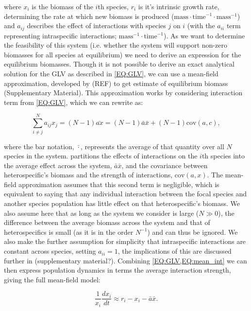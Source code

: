 \documentclass{article}
\begin{document}
where $x_i$ is the biomass of the $i$th species, $r_i$ is it's intrinsic growth rate, determining the rate at which new biomass is produced ($\text{mass} \cdot \text{time}^{-1} \cdot \text{mass}^{-1} $) and $a_{ij}$ describes the effect of interactions with species $j$ on $i$ (with the $a_{ii}$ term representing intraspecific interactions; $\text{mass}^{-1} \cdot \text{time}^{-1}$). As we want to determine the feasibility of this system (i.e. whether the system will support non-zero biomasses for all species at equilibrium) we need to derive an expression for the equilibrium biomasses. Though it is not possible to derive an exact analytical solution for the GLV as described in \cref{EQ:GLV}, we can use a mean-field approximation, developed by (REF) to get estimate of equilibrium biomass (Supplementary Material). This approximation works by considering interaction term from \cref{EQ:GLV}, which we can rewrite as:

\begin{equation} \label{EQ:mean_int} 
    \sum^N_{i \neq j} a_{ij} x_j = (N-1) \bar{a x} = (N-1) \bar{a} \bar{x} + (N-1) \text{cov}(a,c),
\end{equation}

where the bar notation, $\bar{\cdot}$, represents the average of that quantity over all $N$ species in the system.  partitions the effects of interactions on the $i$th species into the average effect across the system, $\bar{a} \bar{x}$, and the covariance between heterospecific's biomass and the strength of interactions, $\text{cov}(a,x)$. The mean-field approximation assumes that this second term is negligible, which is equivalent to saying that any individual interaction between the focal species and another species population has little effect on that heterospecific's biomass. We also assume here that as long as the system we consider is large ($N \gg 0$), the difference between the average biomass across the system and that of heterospecifics is small (as it is in the order $N^{-1}$) and can thus be ignored. We also make the further assumption for simplicity that intraspecific interactions are constant across species, setting $a_{ii} = 1$, the implications of this are discussed further in (supplementary material?). Combining \cref{EQ:GLV,EQ:mean_int}  we can then express population dynamics in terms the average interaction strength, giving the full mean-field model:

\begin{equation} \label{EQ:MF}
    \frac{1}{x_i} \frac{dx_i}{dt} \approx r_i - x_i - \bar{a}\bar{x}.
\end{equation}
\end{document}
